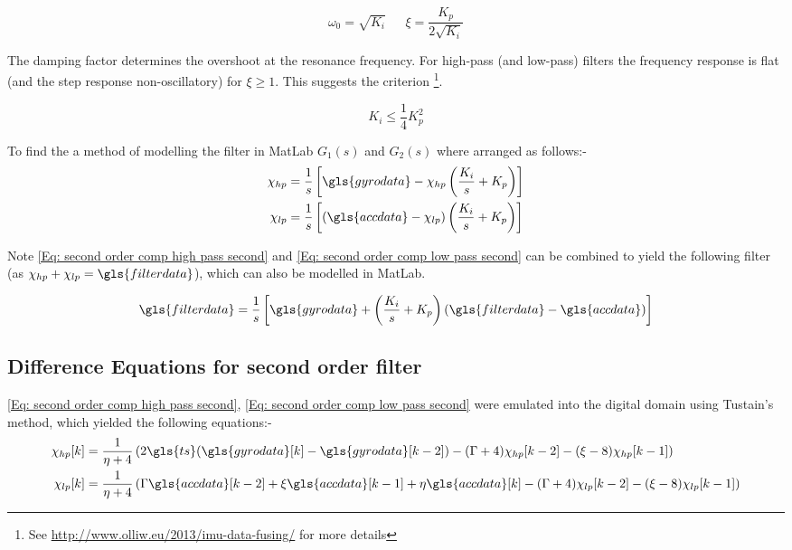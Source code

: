 \begin{equation}
\omega_0 = \sqrt{K_i}~~~~~~~ \xi = \frac{K_p}{2\sqrt{K_i}}
\end{equation}

The damping factor determines the overshoot at the resonance frequency. For high-pass (and low-pass) filters the frequency response is flat (and the step response non-oscillatory) for $\xi \geq 1$. This suggests the criterion \footnote{See \url{http://www.olliw.eu/2013/imu-data-fusing/} for more details}.

\begin{equation}
K_i \leq \frac{1}{4}K_p^2
\end{equation}


To find the a method of modelling the filter in MatLab $G_1(s)$ and $G_2(s)$ where arranged as follows:-
\begin{align}
\chi_{hp} &= \frac{1}{s}\left[\gls{gyrodata} - \chi_{hp}\left({\frac{K_i}{s} + K_p}\right)\right] \label{Eq: second order comp high pass second}\\
\chi_{lp}  &= \frac{1}{s}\left[(\gls{accdata} - \chi_{lp})\left({\frac{K_i}{s} + K_p}\right)\right] \label{Eq: second order comp low pass second}
\end{align}


Note \eqref{Eq: second order comp high pass second} and \eqref{Eq: second order comp low pass second} can be combined to yield the following filter (as $\chi_{hp} + \chi_{lp} =  \gls{filterdata} $), which can also be modelled in MatLab.

\begin{equation}
\gls{filterdata}  = \frac{1}{s}\left[\gls{gyrodata} +\left({\frac{K_i}{s} + K_p}\right)(\gls{filterdata}   - \gls{accdata})\right] \label{eq: comp filter equation used to tune comp filter}
\end{equation}


 \tocless\subsection{Difference Equations for second order filter}
\eqref{Eq: second order comp high pass second}, \eqref{Eq: second order comp low pass second} were emulated into the digital domain using Tustain's method, which yielded the following equations:-
\begin{align}
\chi_{hp}[k] &= \frac{1}{\eta + 4}\left(2\gls{ts} ( \gls{gyrodata} [k] - \gls{gyrodata} [k -2] ) - (\Gamma + 4)\chi_{hp}[k-2] - (\xi - 8)\chi_{hp}[k-1] \right) \label{Eq: second order comp high pass second difference eq}\\
\chi_{lp}[k]  &= \frac{1}{\eta +4}\left(\Gamma \gls{accdata} [k-2] + \xi \gls{accdata} [k-1] + \eta \gls{accdata} [k] - (\Gamma + 4)\chi_{lp}[k-2] - (\xi - 8) \chi_{lp}[k - 1] \right) \label{Eq: second order comp low pass second difference eq}
\end{align}


